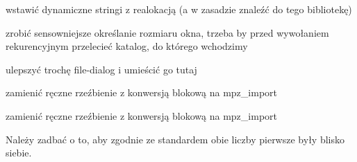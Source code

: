 
\begin{DoxyRefList}
\item[\label{todo__todo000001}%
\hypertarget{todo__todo000001}{}%
Globalny \hyperlink{main__menu_8h_a6eef2d6a085156d095daf050aa146e86}{filename\+\_\+dialog} (char $\ast$title, char $\ast$$\ast$selected\+\_\+file, char $\ast$directory)]wstawić dynamiczne stringi z realokacją (a w zasadzie znaleźć do tego bibliotekę) 

zrobić sensowniejsze określanie rozmiaru okna, trzeba by przed wywołaniem rekurencyjnym przelecieć katalog, do którego wchodzimy  
\item[\label{todo__todo000005}%
\hypertarget{todo__todo000005}{}%
Globalny \hyperlink{simplersa_8c_a721971f42c7ab627a8b1aa3e911296b6}{handle\+\_\+cipher} (int deciphering)]ulepszyć trochę file-\/dialog i umieścić go tutaj  
\item[\label{todo__todo000003}%
\hypertarget{todo__todo000003}{}%
Globalny \hyperlink{rsa__decode_8h_a0d046beaadebe2a78d295653b0496ff2}{rsa\+\_\+decode\+\_\+file} (F\+I\+L\+E $\ast$input\+\_\+file, F\+I\+L\+E $\ast$output\+\_\+file, mpz\+\_\+t $\ast$n, mpz\+\_\+t $\ast$d, int block\+\_\+size, int out\+\_\+block\+\_\+size, int verbose)]zamienić ręczne rzeźbienie z konwersją blokową na mpz\+\_\+import  
\item[\label{todo__todo000002}%
\hypertarget{todo__todo000002}{}%
Globalny \hyperlink{rsa__decode_8h_a104ba9e7109ef4145b66b677c07db5da}{rsa\+\_\+encode\+\_\+file} (F\+I\+L\+E $\ast$input\+\_\+file, F\+I\+L\+E $\ast$output\+\_\+file, mpz\+\_\+t $\ast$n, mpz\+\_\+t $\ast$e, int block\+\_\+size, int out\+\_\+block\+\_\+size, int verbose)]zamienić ręczne rzeźbienie z konwersją blokową na mpz\+\_\+import  
\item[\label{todo__todo000004}%
\hypertarget{todo__todo000004}{}%
Globalny \hyperlink{rsa__keygen_8h_a85616a49cb19f839340943ee844c508e}{rsa\+\_\+keygen} (int no\+\_\+bits, mpz\+\_\+t $\ast$n, mpz\+\_\+t $\ast$d, mpz\+\_\+t $\ast$e, int long\+\_\+public)]Należy zadbać o to, aby zgodnie ze standardem obie liczby pierwsze były blisko siebie. 
\end{DoxyRefList}
